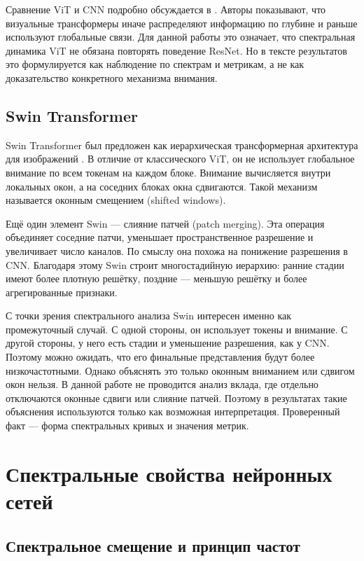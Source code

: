 Сравнение ViT и CNN подробно обсуждается в \cite{raghu2021do}. Авторы показывают, что визуальные трансформеры иначе распределяют информацию по глубине и раньше используют глобальные связи. Для данной работы это означает, что спектральная динамика ViT не обязана повторять поведение ResNet. Но в тексте результатов это формулируется как наблюдение по спектрам и метрикам, а не как доказательство конкретного механизма внимания.

\subsection{Swin Transformer}

Swin Transformer был предложен как иерархическая трансформерная архитектура для изображений \cite{liu2021swin}. В отличие от классического ViT, он не использует глобальное внимание по всем токенам на каждом блоке. Внимание вычисляется внутри локальных окон, а на соседних блоках окна сдвигаются. Такой механизм называется оконным смещением (shifted windows).

Ещё один элемент Swin — слияние патчей (patch merging). Эта операция объединяет соседние патчи, уменьшает пространственное разрешение и увеличивает число каналов. По смыслу она похожа на понижение разрешения в CNN. Благодаря этому Swin строит многостадийную иерархию: ранние стадии имеют более плотную решётку, поздние — меньшую решётку и более агрегированные признаки.

С точки зрения спектрального анализа Swin интересен именно как промежуточный случай. С одной стороны, он использует токены и внимание. С другой стороны, у него есть стадии и уменьшение разрешения, как у CNN. Поэтому можно ожидать, что его финальные представления будут более низкочастотными. Однако объяснять это только оконным вниманием или сдвигом окон нельзя. В данной работе не проводится анализ вклада, где отдельно отключаются оконные сдвиги или слияние патчей. Поэтому в результатах такие объяснения используются только как возможная интерпретация. Проверенный факт — форма спектральных кривых и значения метрик.

\section{Спектральные свойства нейронных сетей}

\subsection{Спектральное смещение и принцип частот}

